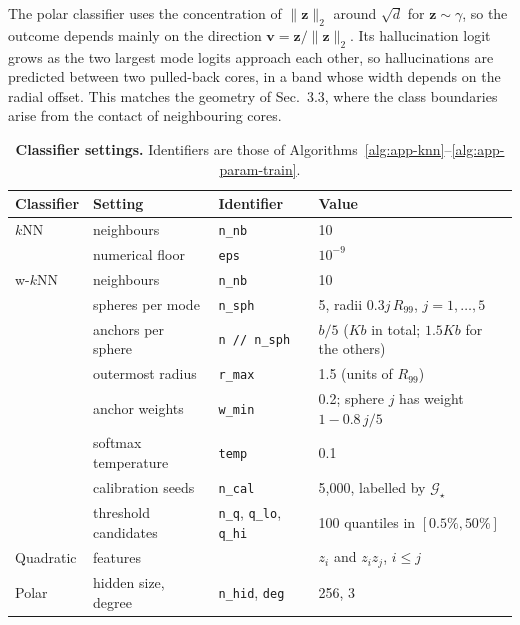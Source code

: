 The polar classifier uses the concentration of $\|\boldsymbol{z}\|_2$ around $\sqrt{d}$ for
$\boldsymbol{z} \sim \gamma$, so the outcome depends mainly on the direction
$\boldsymbol{v} = \boldsymbol{z}/\|\boldsymbol{z}\|_2$. Its hallucination logit grows as the two
largest mode logits approach each other, so hallucinations are predicted between two pulled-back
cores, in a band whose width depends on the radial offset. This matches the geometry of Sec.~3.3,
where the class boundaries arise from the contact of neighbouring cores.

\begin{table}[htbp]
\centering
\small
\setlength{\tabcolsep}{4pt}
\caption{\textbf{Classifier settings.} Identifiers are those of
Algorithms~\ref{alg:app-knn}--\ref{alg:app-param-train}.}
\label{tab:app-classifiers}
\begin{tabular}{llll}
\toprule
Classifier & Setting & Identifier & Value \\
\midrule
$k$NN          & neighbours                & \texttt{n\_nb}     & 10 \\
               & numerical floor           & \texttt{eps}       & $10^{-9}$ \\
\midrule
w-$k$NN        & neighbours                & \texttt{n\_nb}     & 10 \\
               & spheres per mode          & \texttt{n\_sph}    & 5, radii $0.3j\,R_{99}$, $j = 1, \dots, 5$ \\
               & anchors per sphere        & \texttt{n // n\_sph} & $b/5$ ($Kb$ in total; $1.5Kb$ for the others) \\
               & outermost radius          & \texttt{r\_max}    & 1.5 (units of $R_{99}$) \\
               & anchor weights            & \texttt{w\_min}    & 0.2; sphere $j$ has weight $1 - 0.8\,j/5$ \\
               & softmax temperature       & \texttt{temp}      & 0.1 \\
               & calibration seeds         & \texttt{n\_cal}    & 5{,}000, labelled by $\mathcal{G}_\star$ \\
               & threshold candidates      & \texttt{n\_q}, \texttt{q\_lo}, \texttt{q\_hi} & 100 quantiles in $[0.5\%, 50\%]$ \\
\midrule
Quadratic      & features                  &                    & $z_i$ and $z_i z_j$, $i \le j$ \\
\midrule
Polar          & hidden size, degree       & \texttt{n\_hid}, \texttt{deg} & 256, 3 \\

\end{tabular}
\end{table}
